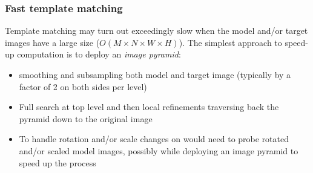 \documentclass{article}
\begin{document}
\subsubsection{Fast template matching}
Template matching may turn out exceedingly slow when the model and/or target images have a large size ($O(M\times N \times W \times H)$). The simplest approach to speed-up computation is to deploy an \emph{image pyramid}:
\begin{itemize}
    \item smoothing and subsampling both model and target image (typically by a factor of 2 on both sides per level) 
    \item Full search at top level and then local refinements traversing back the pyramid down to the original image 
    \item To handle rotation and/or scale changes on would need to probe rotated and/or scaled model images, possibly while deploying an image pyramid to speed up the process
\end{itemize}
\end{document}
